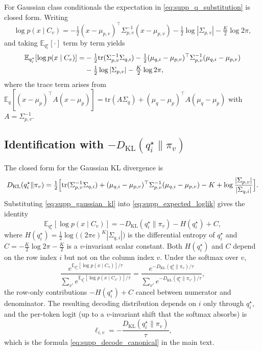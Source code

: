 \documentclass[twoside,11pt]{article}
\begin{document}
For Gaussian class conditionals the expectation in \eqref{eq:supp_q_substitution} is closed form. Writing
\[
\log p(x \mid C_v) = -\tfrac{1}{2}(x - \mu_{p,v})^{\top} \Sigma_{p,v}^{-1} (x - \mu_{p,v}) - \tfrac{1}{2}\log|\Sigma_{p,v}| - \tfrac{K}{2}\log 2\pi,
\]
and taking $\mathbb{E}_{q_i^{\star}}[\cdot]$ term by term yields
\begin{align}
\mathbb{E}_{q_i^{\star}}[\log p(x \mid C_v)]
= & -\tfrac{1}{2} \mathrm{tr}(\Sigma_{p,v}^{-1} \Sigma_{q,i})
- \tfrac{1}{2} (\mu_{q,i} - \mu_{p,v})^{\top} \Sigma_{p,v}^{-1} (\mu_{q,i} - \mu_{p,v}) \notag \\
& - \tfrac{1}{2}\log|\Sigma_{p,v}| - \tfrac{K}{2}\log 2\pi,
\label{eq:supp_expected_loglik}
\end{align}
where the trace term arises from $\mathbb{E}_q[(x-\mu_p)^{\top} A (x-\mu_p)] = \mathrm{tr}(A \Sigma_q) + (\mu_q-\mu_p)^{\top} A (\mu_q-\mu_p)$ with $A = \Sigma_{p,v}^{-1}$.

\subsection{Identification with $-D_{\mathrm{KL}}(q_i^{\star} \| \pi_v)$}

The closed form for the Gaussian KL divergence \cite[App.~B]{Bishop2006} is
\begin{equation}
D_{\mathrm{KL}}(q_i^{\star} \| \pi_v)
=
\tfrac{1}{2}\Bigl[
\mathrm{tr}(\Sigma_{p,v}^{-1}\Sigma_{q,i})
+ (\mu_{q,i} - \mu_{p,v})^{\top} \Sigma_{p,v}^{-1} (\mu_{q,i} - \mu_{p,v})
- K
+ \log\frac{|\Sigma_{p,v}|}{|\Sigma_{q,i}|}
\Bigr].
\label{eq:supp_gaussian_kl}
\end{equation}
Substituting \eqref{eq:supp_gaussian_kl} into \eqref{eq:supp_expected_loglik} gives the identity
\begin{equation}
\mathbb{E}_{q_i^{\star}}[\log p(x \mid C_v)]
=
-D_{\mathrm{KL}}(q_i^{\star} \| \pi_v)
- H(q_i^{\star})
+ C,
\label{eq:supp_kl_decomposition}
\end{equation}
where $H(q_i^{\star}) = \tfrac{1}{2}\log\bigl((2\pi e)^K |\Sigma_{q,i}|\bigr)$ is the differential entropy of $q_i^{\star}$ and $C = -\tfrac{K}{2}\log 2\pi - \tfrac{K}{2}$ is a $v$-invariant scalar constant. Both $H(q_i^{\star})$ and $C$ depend on the row index $i$ but not on the column index $v$. Under the softmax over $v$,
\begin{equation}
\frac{e^{\mathbb{E}_{q_i^{\star}}[\log p(x \mid C_v)]/\tau}}
     {\sum_{v'} e^{\mathbb{E}_{q_i^{\star}}[\log p(x \mid C_{v'})]/\tau}}
=
\frac{e^{-D_{\mathrm{KL}}(q_i^{\star} \| \pi_v)/\tau}}
     {\sum_{v'} e^{-D_{\mathrm{KL}}(q_i^{\star} \| \pi_{v'})/\tau}},
\label{eq:supp_softmax_cancellation}
\end{equation}
the row-only contributions $-H(q_i^{\star}) + C$ cancel between numerator and denominator. The resulting decoding distribution depends on $i$ only through $q_i^{\star}$, and the per-token logit (up to a $v$-invariant shift that the softmax absorbs) is
\begin{equation}
\ell_{i,v} = -\frac{D_{\mathrm{KL}}(q_i^{\star} \| \pi_v)}{\tau},
\label{eq:supp_decode_recovered}
\end{equation}
which is the formula \eqref{eq:supp_decode_canonical} in the main text.
\end{document}
